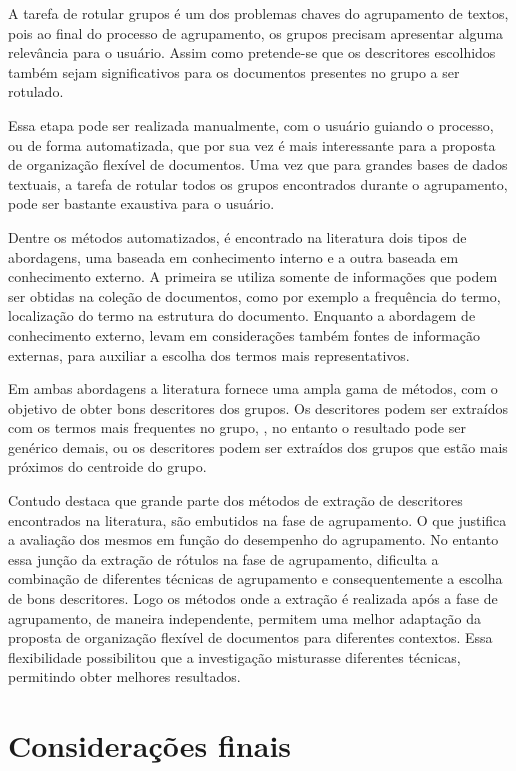 A tarefa de rotular grupos é um dos problemas chaves do agrupamento de textos, pois ao final do
processo de agrupamento, os grupos precisam apresentar alguma relevância para o
usuário\cite{Zhang2008}. Assim como pretende-se que os descritores escolhidos também sejam
significativos para os documentos presentes no grupo a ser rotulado. 

Essa etapa pode ser realizada manualmente, com o usuário guiando o processo, ou de forma
automatizada, que por sua vez é mais interessante para a proposta de organização flexível de
documentos. Uma vez que para grandes bases de dados textuais, a tarefa de rotular todos os grupos
encontrados durante o agrupamento, pode ser bastante exaustiva para o usuário.

Dentre os métodos automatizados, é encontrado na literatura dois tipos de abordagens, uma baseada em
conhecimento interno e a outra baseada em conhecimento externo\cite{Nogueira2013}.  A primeira se
utiliza somente de informações que podem ser obtidas na coleção de documentos, como por exemplo a
frequência do termo, localização do termo na estrutura do documento.  Enquanto a abordagem de
conhecimento externo, levam em considerações também fontes de informação externas, para auxiliar a
escolha dos termos mais representativos. 

Em ambas abordagens a literatura fornece uma ampla gama de métodos, com o objetivo de obter bons
descritores dos grupos. Os descritores podem ser extraídos com os termos mais frequentes no grupo, ,
no entanto o resultado pode ser genérico demais\cite{Pucktada2006}, ou os descritores podem ser
extraídos dos grupos que estão mais próximos do centroide do grupo.

Contudo \cite{Nogueira2013} destaca que grande parte dos métodos de extração de descritores
encontrados na literatura, são embutidos na fase de agrupamento. O que justifica a avaliação dos
mesmos em função do desempenho do agrupamento. No entanto essa junção da extração de rótulos na fase
de agrupamento, dificulta a combinação de diferentes técnicas de agrupamento e consequentemente a
escolha de bons descritores. Logo os métodos onde a extração é realizada após a fase de agrupamento,
de maneira independente, permitem uma melhor adaptação da proposta de organização flexível de
documentos para diferentes contextos. Essa flexibilidade possibilitou que a investigação misturasse
diferentes técnicas, permitindo obter melhores resultados.

\section{Considerações finais}




